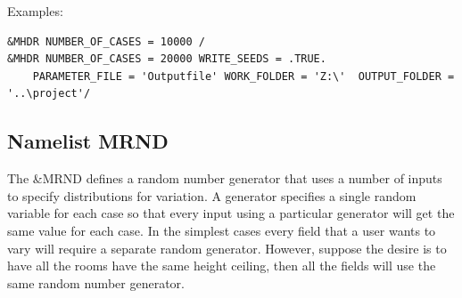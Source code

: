 \documentclass[12pt,twoside]{book}
\begin{document}
\vspace{\baselineskip}
\noindent Examples:
\begin{lstlisting}
&MHDR NUMBER_OF_CASES = 10000 /
&MHDR NUMBER_OF_CASES = 20000 WRITE_SEEDS = .TRUE.
	PARAMETER_FILE = 'Outputfile' WORK_FOLDER = 'Z:\'  OUTPUT_FOLDER = '..\project'/
\end{lstlisting}



\subsection{Namelist MRND}

The {\ct \&MRND} defines a random number generator that uses a number of inputs to specify distributions for variation. A generator specifies a single random variable for each case so that every input using a particular generator will get the same value for each case. In the simplest cases every field that a user wants to vary will require a separate random generator. However, suppose the desire is to have all the rooms have the same height ceiling, then all the fields will use the same random number generator. %
\end{document}

